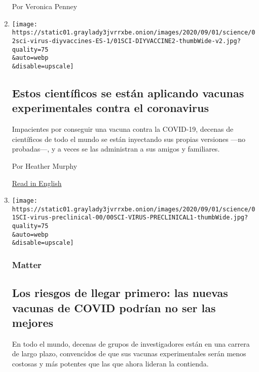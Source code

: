 \begin{enumerate}
  Por Veronica Penney
\item
  \href{/es/2020/09/02/espanol/ciencia-y-tecnologia/vacunas-experimentales-coronavirus.html}{}

  \texttt{[image: https://static01.graylady3jvrrxbe.onion/images/2020/09/01/science/02sci-virus-diyvaccines-ES-1/01SCI-DIYVACCINE2-thumbWide-v2.jpg?quality=75\\\&auto=webp\\\&disable=upscale]}

  \hypertarget{estos-cientuxedficos-se-estuxe1n-aplicando-vacunas-experimentales-contra-el-coronavirus}{%
  \subsection{Estos científicos se están aplicando vacunas
  experimentales contra el
  coronavirus}\label{estos-cientuxedficos-se-estuxe1n-aplicando-vacunas-experimentales-contra-el-coronavirus}}

  Impacientes por conseguir una vacuna contra la COVID-19, decenas de
  científicos de todo el mundo se están inyectando sus propias versiones
  ---no probadas---, y a veces se las administran a sus amigos y
  familiares.

  Por Heather Murphy

  \href{https://www.nytimes3xbfgragh.onion/2020/09/01/science/covid-19-vaccine-diy.html}{Read
  in English}
\item
  \href{/es/2020/09/01/espanol/ciencia-y-tecnologia/vacuna-coronavirus.html}{}

  \texttt{[image: https://static01.graylady3jvrrxbe.onion/images/2020/09/01/science/01SCI-virus-preclinical-00/00SCI-VIRUS-PRECLINICAL1-thumbWide.jpg?quality=75\\\&auto=webp\\\&disable=upscale]}

  \hypertarget{matter}{%
  \subsubsection{Matter}\label{matter}}

  \hypertarget{los-riesgos-de-llegar-primero-las-nuevas-vacunas-de-covid-podruxedan-no-ser-las-mejores}{%
  \subsection{Los riesgos de llegar primero: las nuevas vacunas de COVID
  podrían no ser las
  mejores}\label{los-riesgos-de-llegar-primero-las-nuevas-vacunas-de-covid-podruxedan-no-ser-las-mejores}}

  En todo el mundo, decenas de grupos de investigadores están en una
  carrera de largo plazo, convencidos de que sus vacunas experimentales
  serán menos costosas y más potentes que las que ahora lideran la
  contienda.


\end{enumerate}
